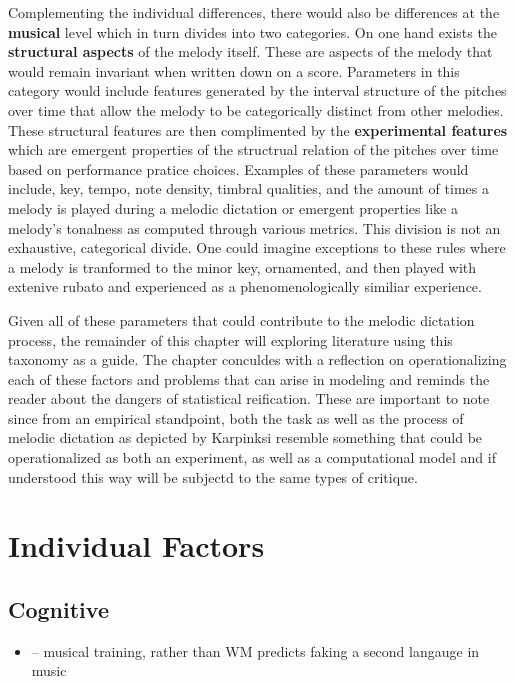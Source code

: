 \documentclass[]{book}
\providecommand{\tightlist}{%
  \setlength{\itemsep}{0pt}\setlength{\parskip}{0pt}}
\begin{document}
Complementing the individual differences, there would also be differences at the \textbf{musical} level which in turn divides into two categories.
On one hand exists the \textbf{structural aspects} of the melody itself.
These are aspects of the melody that would remain invariant when written down on a score.
Parameters in this category would include features generated by the interval structure of the pitches over time that allow the melody to be categorically distinct from other melodies.
These structural features are then complimented by the \textbf{experimental features} which are emergent properties of the structrual relation of the pitches over time based on performance pratice choices.
Examples of these parameters would include, key, tempo, note density, timbral qualities, and the amount of times a melody is played during a melodic dictation or emergent properties like a melody's tonalness as computed through various metrics.
This division is not an exhaustive, categorical divide.
One could imagine exceptions to these rules where a melody is tranformed to the minor key, ornamented, and then played with extenive rubato and experienced as a phenomenologically similiar experience.

Given all of these parameters that could contribute to the melodic dictation process, the remainder of this chapter will exploring literature using this taxonomy as a guide.
The chapter conculdes with a reflection on operationalizing each of these factors and problems that can arise in modeling and reminds the reader about the dangers of statistical reification.
These are important to note since from an empirical standpoint, both the task as well as the process of melodic dictation as depicted by Karpinksi resemble something that could be operationalized as both an experiment, as well as a computational model and if understood this way will be subjectd to the same types of critique.

\hypertarget{individual-factors}{%
\section{Individual Factors}\label{individual-factors}}

\hypertarget{cognitive}{%
\subsection{Cognitive}\label{cognitive}}

\begin{itemize}
\tightlist
\item
  \citep{coumelSecondLanguageAccent2019} -- musical training, rather than WM predicts faking a second langauge in music
\end{itemize}
\end{document}
